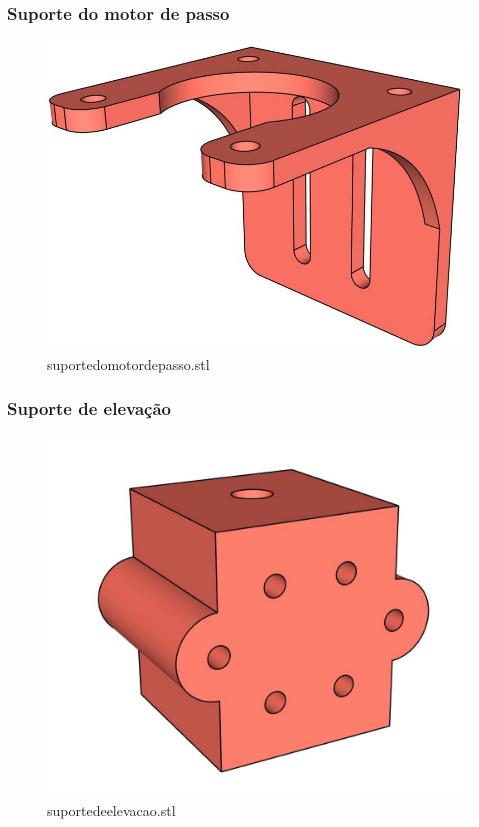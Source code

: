 \begin{frame}
    \frametitle{Suporte do motor de passo}
        \begin{figure}
            \centering
            \includegraphics[scale = 0.2]{figuras/ressuportemotorpasso}
            \caption{suportedomotordepasso.stl}
        \end{figure}
\end{frame}

\begin{frame}
    \frametitle{Suporte de elevação}
        \begin{figure}
            \centering
            \includegraphics[scale = 0.15]{figuras/ressuporteelevacao}
            \caption{suportedeelevacao.stl}
        \end{figure}
\end{frame}

